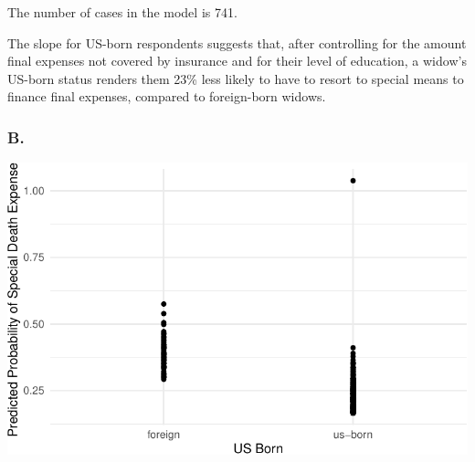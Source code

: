 \documentclass[
  letterpaper,
  DIV=11,
  numbers=noendperiod]{scrartcl}
\newenvironment{Shaded}{\begin{snugshade}}{\end{snugshade}}
\newcommand{\AttributeTok}[1]{\textcolor[rgb]{0.40,0.45,0.13}{#1}}
\newcommand{\CommentTok}[1]{\textcolor[rgb]{0.37,0.37,0.37}{#1}}
\newcommand{\FunctionTok}[1]{\textcolor[rgb]{0.28,0.35,0.67}{#1}}
\newcommand{\NormalTok}[1]{\textcolor[rgb]{0.00,0.23,0.31}{#1}}
\newcommand{\OtherTok}[1]{\textcolor[rgb]{0.00,0.23,0.31}{#1}}
\newcommand{\SpecialCharTok}[1]{\textcolor[rgb]{0.37,0.37,0.37}{#1}}
\newcommand{\StringTok}[1]{\textcolor[rgb]{0.13,0.47,0.30}{#1}}
\begin{document}
The number of cases in the model is 741.

The slope for US-born respondents suggests that, after controlling for
the amount final expenses not covered by insurance and for their level
of education, a widow's US-born status renders them 23\% less likely to
have to resort to special means to finance final expenses, compared to
foreign-born widows.

\subsubsection{B.}\label{b.}

\begin{Shaded}
\end{Shaded}

\includegraphics{homework2_Ton_files/figure-pdf/predicted_values_ols_plot-1.pdf}
\end{document}
